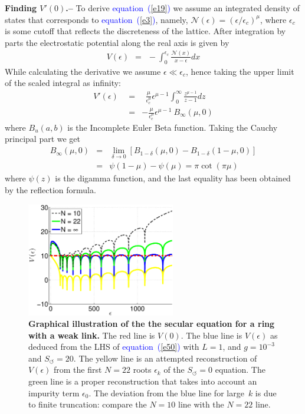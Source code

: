 \documentclass[aps,pre,floats,floatfix,twocolumn]{revtex4}
\newcommand{\beq}{\begin{eqnarray}}
\newcommand{\eeq}{\end{eqnarray}}
\newcommand{\Eq}[1]{\textcolor{blue}{{equation}\!~(\ref{#1})}}
\newcommand{\sect}[1]{{\bf #1.-- }}
\begin{document}
\sect{Finding $V'(0)$}
%
To derive \Eq{e19} we assume an integrated density of states that corresponds to \Eq{e3}, 
namely, ${\mathcal{N}(\epsilon) = (\epsilon/\epsilon_c)^{\mu}}$, 
where $\epsilon_c$ is some cutoff that reflects the discreteness of the lattice.
After integration by parts the electrostatic potential along the real axis is given by 
%
\beq
V(\epsilon) \ \ = \ \ -  \int_0^{\epsilon_c} \frac{\mathcal{N}(x)}{x-\epsilon}dx
\eeq
%
While calculating the derivative we assume ${\epsilon \ll \epsilon_c}$, 
hence taking the upper limit of the scaled integral as infinity: 
%
\beq
V'(\epsilon) \ \ &=& \ \ 
\frac{\mu}{\epsilon_c^{\mu}} \epsilon^{\mu-1} \int_0^{\infty} \frac{z^{\mu-1}}{z-1}dz 
\\
&=&   
-\frac{\mu}{\epsilon_c^{\mu}}  \epsilon^{\mu-1} \ B_{\infty}(\mu,0)
\eeq  
%
where $B_u(a,b)$ is the Incomplete Euler Beta function.
Taking the Cauchy principal part we get
%
\beq
B_{\infty}(\mu,0) &=&  
\lim_{\delta \to 0}  \left[ B_{1-\delta}(\mu,0) - B_{1-\delta}(1-\mu,0) \right]  
\\
&=& \psi(1-\mu)-\psi(\mu) = \pi \cot(\pi \mu)
\eeq
%
where $\psi(z)$ is the digamma function,
and the last equality has been obtained by the reflection formula. 
\\



\begin{figure}

\includegraphics[height=5cm]{gRing_ES_vs_cont}

\caption{\label{figReconstruction} 
{\bf Graphical illustration of the the secular equation for a ring with a weak link.} 
The red line is $V(0)$.  
The blue line is $V(\epsilon)$ as deduced from the LHS of \Eq{e50}
with ${L=1}$, and ${g=10^{-3}}$ and ${S_{\circlearrowleft}=20}$.
The yellow line is an attempted reconstruction of $V(\epsilon)$ 
from the first $N=22$ roots $\epsilon_k$ of the $S_{\circlearrowleft}{=}0$ equation. 
The green line is a proper reconstruction that takes into account 
an impurity term $\epsilon_0$. The deviation from the blue line 
for large~$k$ is due to finite truncation: compare the ${N{=}10}$ line with the ${N{=}22}$ line. 
}
\end{figure}
\end{document}
